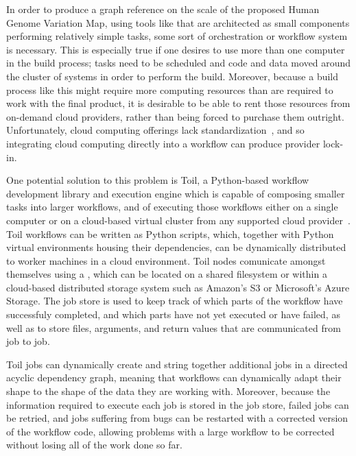 
In order to produce a graph reference on the scale of the proposed Human Genome Variation Map, using tools like \vg that are architected as small components performing relatively simple tasks, some sort of orchestration or workflow system is necessary. This is especially true if one desires to use more than one computer in the build process; tasks need to be scheduled and code and data moved around the cluster of systems in order to perform the build. Moreover, because a build process like this might require more computing resources than are required to work with the final product, it is desirable to be able to rent those resources from on-demand cloud providers, rather than being forced to purchase them outright. Unfortunately, cloud computing offerings lack standardization~\cite{ortiz2011problem}, and so integrating cloud computing directly into a workflow can produce provider lock-in.

One potential solution to this problem is Toil, a Python-based workflow development library and execution engine which is capable of composing smaller tasks into larger workflows, and of executing those workflows either on a single computer or on a cloud-based virtual cluster from any supported cloud provider~\cite{vivian2017toil}. Toil workflows can be written as Python scripts, which, together with Python virtual environments housing their dependencies, can be dynamically distributed to worker machines in a cloud environment. Toil nodes comunicate amongst themselves using a , which can be located on a shared filesystem or within a cloud-based distributed storage system such as Amazon's S3 or Microsoft's Azure Storage. The job store is used to keep track of which parts of the workflow have successfuly completed, and which parts have not yet executed or have failed, as well as to store files, arguments, and return values that are communicated from job to job.

Toil jobs can dynamically create and string together additional jobs in a directed acyclic dependency graph, meaning that workflows can dynamically adapt their shape to the shape of the data they are working with. Moreover, because the information required to execute each job is stored in the job store, failed jobs can be retried, and jobs suffering from bugs can be restarted with a corrected version of the workflow code, allowing problems with a large workflow to be corrected without losing all of the work done so far.

